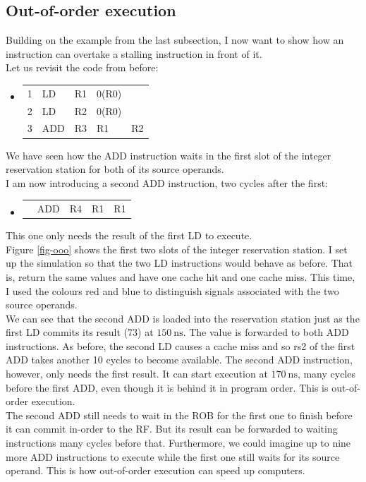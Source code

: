 \documentclass[12pt,a4paper]{article} %
\newenvironment {assembly}{\begingroup \ttfamily \color{Gray} \begin{itemize} \item[]}{\end{itemize}\endgroup}
\begin{document}
\subsection{Out-of-order execution}
Building on the example from the last subsection, I now want to show how an instruction can overtake a stalling instruction in front of it. \\
Let us revisit the code from before:
\begin{assembly}
	\begin{tabularx} {\textwidth} {n o a a X}
		1 & LD  & R1 & 0(R0)	& \\
		2 & LD  & R2 & 0(R0)	& \\
		3 & ADD & R3 & R1		& R2\\
	\end{tabularx}%
\end{assembly}%
We have seen how the ADD instruction waits in the first slot of the integer reservation station for both of its source operands. \\
I am now introducing a second ADD instruction, two cycles after the first:
\begin{assembly}
	\begin{tabularx} {\textwidth} {n o a a X}
		  & ADD & R4 & R1		& R1\\
	\end{tabularx}%
\end{assembly}%
This one only needs the result of the first LD to execute. \\
Figure \ref{fig-ooo} shows the first two slots of the integer reservation station. I set up the simulation so that the two LD instructions would behave as before. That is, return the same values and have one cache hit and one cache miss. This time, I used the colours red and blue to distinguish signals associated with the two source operands. \\
We can see that the second ADD is loaded into the reservation station just as the first LD commits its result ($73$) at $\SI{150}{\ns}$. The value is forwarded to both ADD instructions. As before, the second LD causes a cache miss and so rs2 of the first ADD takes another 10 cycles to become available. The second ADD instruction, however, only needs the first result. It can start execution at $\SI{170}{\ns}$, many cycles before the first ADD, even though it is behind it in program order. This is out-of-order execution. \\
The second ADD still needs to wait in the ROB for the first one to finish before it can commit in-order to the RF. But its result can be forwarded to waiting instructions many cycles before that. Furthermore, we could imagine up to nine more ADD instructions to execute while the first one still waits for its source operand. This is how out-of-order execution can speed up computers.
\end{document}
